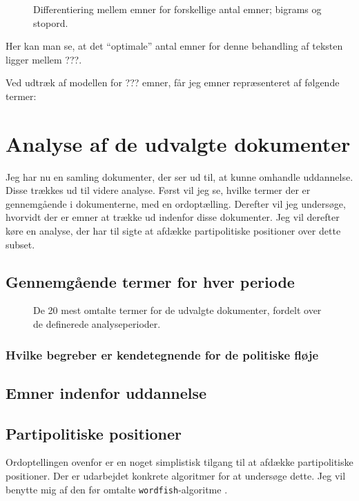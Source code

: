 \begin{figure}[H]
\centering

\caption{Differentiering mellem emner for forskellige antal emner; bigrams og stopord. }
\end{figure}

Her kan man se, at det “optimale” antal emner for denne behandling af teksten ligger mellem ???.

Ved udtræk af modellen for ??? emner, får jeg emner repræsenteret af følgende termer:

\chapter{Analyse af de udvalgte dokumenter}

Jeg har nu en samling dokumenter, der ser ud til, at kunne omhandle uddannelse.
Disse trækkes ud til videre analyse.
Først vil jeg se, hvilke termer der er gennemgående i dokumenterne, med en ordoptælling.
Derefter vil jeg undersøge, hvorvidt der er emner at trække ud indenfor disse dokumenter.
Jeg vil derefter køre en analyse, der har til sigte at afdække partipolitiske positioner over dette subset.

\section{Gennemgående termer for hver periode}

\begin{figure}
  \caption{De 20 mest omtalte termer for de udvalgte dokumenter, fordelt over de definerede analyseperioder.} 
\end{figure}

\subsection{Hvilke begreber er kendetegnende for de politiske fløje}

\section{Emner indenfor uddannelse}

\section{Partipolitiske positioner}

Ordoptellingen ovenfor er en noget simplistisk tilgang til at afdække partipolitiske positioner.
Der er udarbejdet konkrete algoritmer for at undersøge dette.
Jeg vil benytte mig af den før omtalte \texttt{wordfish}-algoritme \autocite{slapinScalingModelEstimating2008}.

